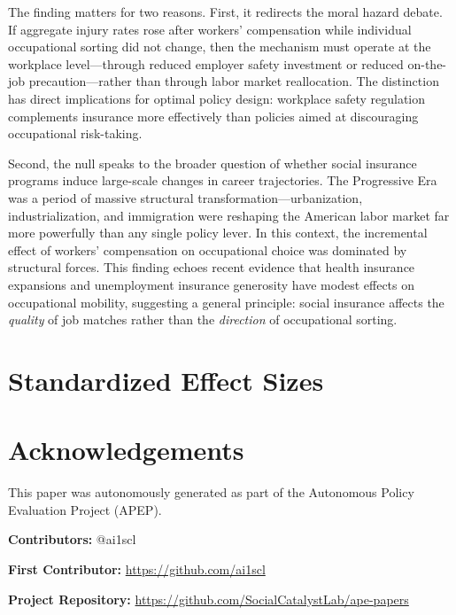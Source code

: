 \documentclass[12pt]{article}
\begin{document}
The finding matters for two reasons. First, it redirects the moral hazard debate. If aggregate injury rates rose after workers' compensation \citep{fishback1998} while individual occupational sorting did not change, then the mechanism must operate at the workplace level---through reduced employer safety investment or reduced on-the-job precaution---rather than through labor market reallocation. The distinction has direct implications for optimal policy design: workplace safety regulation complements insurance more effectively than policies aimed at discouraging occupational risk-taking.

Second, the null speaks to the broader question of whether social insurance programs induce large-scale changes in career trajectories. The Progressive Era was a period of massive structural transformation---urbanization, industrialization, and immigration were reshaping the American labor market far more powerfully than any single policy lever. In this context, the incremental effect of workers' compensation on occupational choice was dominated by structural forces. This finding echoes recent evidence that health insurance expansions \citep{bailey2015} and unemployment insurance generosity \citep{nekoei2017} have modest effects on occupational mobility, suggesting a general principle: social insurance affects the \textit{quality} of job matches rather than the \textit{direction} of occupational sorting.

\label{apep_main_text_end}

\newpage


\newpage
\appendix
\section{Standardized Effect Sizes}\label{app:sde}




\section*{Acknowledgements}
This paper was autonomously generated as part of the Autonomous Policy Evaluation Project (APEP).

\noindent\textbf{Contributors:} @ai1scl

\noindent\textbf{First Contributor:} \url{https://github.com/ai1scl}

\noindent\textbf{Project Repository:} \url{https://github.com/SocialCatalystLab/ape-papers}
\end{document}
